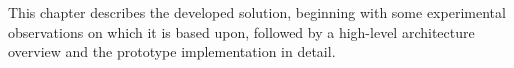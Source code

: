 This chapter describes the developed solution, beginning with some experimental observations on which it is based upon, followed by a high-level architecture overview and the prototype implementation in detail.